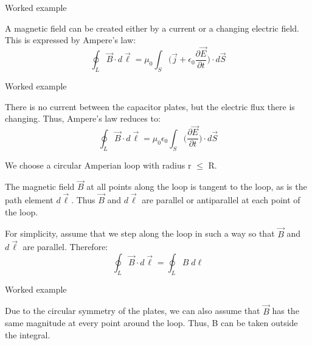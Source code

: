{\begin{frame}{Worked example }
\vspace{0.2cm}

A magnetic field can be created either by a current or a changing electric field.
This is expressed by Ampere's law:
\begin{equation*}
    \oint_{L} \vec{B} \cdot d\vec{\ell} = \mu_0 \int_{S} \Big( \vec{j} + \epsilon_0  \frac{\partial \vec{E}}{\partial t} \Big) \cdot d\vec{S}
\end{equation*}

\end{frame}

%
%
%

\begin{frame}{Worked example }

There is no current between the capacitor plates, but the electric flux there is changing.
Thus, Ampere's law reduces to:
\begin{equation*}
    \oint_{L} \vec{B} \cdot d\vec{\ell} = \mu_0 \epsilon_0 \int_{S} \Big( \frac{\partial \vec{E}}{\partial t} \Big) \cdot d\vec{S}
\end{equation*}

\vspace{0.2cm}

We choose a circular Amperian loop with radius r $\le$ R.

\vspace{0.2cm}

The magnetic field $\vec{B}$ at all points along the loop is tangent to the loop, as is the path element $d\vec{\ell}$.
Thus $\vec{B}$ and $d\vec{\ell}$ are parallel or antiparallel at each point of the loop.

\vspace{0.2cm}

For simplicity, assume that we step along the loop in such a way so that $\vec{B}$ and $d\vec{\ell}$ are parallel.
Therefore:
\begin{equation*}
    \oint_{L} \vec{B} \cdot d\vec{\ell} = \oint_{L}  B \; d\ell
\end{equation*}

\end{frame}

%
%
%

\begin{frame}{Worked example }

Due to the circular symmetry of the plates, we can also assume that $\vec{B}$ has the same
magnitude at every point around the loop. Thus, B can be taken outside the integral.


\end{frame}}
